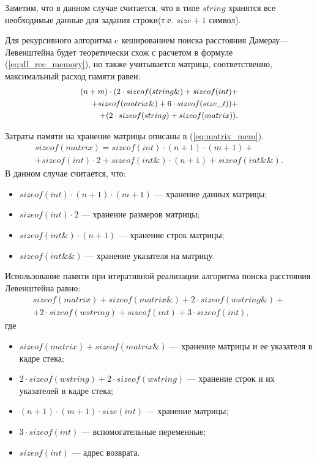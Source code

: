 Заметим, что в данном случае считается, что в типе $string$ хранятся все необходимые данные для задания строки(т.е. $size + 1$ символ).

Для рекурсивного алгоритма c кешированием поиска расстояния Дамерау---Левенштейна будет теоретически схож с расчетом в формуле (\ref{eq:dl_rec_memory}),
но также учитывается матрица, соответственно, максимальный расход памяти равен:
\begin{equation}
	\label{eq:dl_hash_memory}
    \small
	\begin{aligned}
		(n + m) \cdot (2 \cdot sizeof(string\&) + sizeof(int)+\\ +sizeof(matrix\&) + 6 \cdot sizeof(size\_t))+ \\
        + (2 \cdot sizeof(string) + sizeof(matrix)).
	\end{aligned}
\end{equation}

Затраты памяти на хранение матрицы описаны в  (\ref{eq:matrix_mem}).
\begin{equation}
	\label{eq:matrix_mem}
    \begin{aligned}
	sizeof(matrix) = sizeof(int) \cdot (n+1) \cdot (m + 1)+  \\
    + sizeof(int) \cdot 2 + sizeof(int\&) \cdot (n + 1) + sizeof(int\&\&).
    \end{aligned}
\end{equation}
В данном случае считается, что:
\begin{itemize}
	\item $sizeof(int) \cdot (n+1) \cdot (m + 1)$ --- хранение данных матрицы;
	\item $sizeof(int) \cdot 2$ --- хранение размеров матрицы;
	\item $sizeof(int\&) \cdot (n + 1)$ --- хранение строк матрицы;
	\item $sizeof(int\&\&)$ --- хранение указателя на матрицу.
\end{itemize}


Использование памяти при итеративной реализации алгоритма поиска расстояния Левенштейна  равно:
\begin{equation}
	\label{eq:lev_mtr_memory}
	\begin{aligned}
		sizeof(matrix) + sizeof(matrix\&) + 2 \cdot sizeof(wstring\&)+\\
        + 2 \cdot sizeof(wstring) + sizeof(int) + 3 \cdot sizeof(int),
	\end{aligned}
\end{equation}
где
\begin{itemize}
	\item $sizeof(matrix) + sizeof(matrix\&)$ --- хранение матрицы и ее указателя в кадре стека;
	\item $2 \cdot sizeof(wstring) + 2 \cdot sizeof(wstring)$ --- хранение строк и их указателей в кадре стека;
	\item $(n + 1) \cdot (m + 1) \cdot size(int)$ --- хранение матрицы;
	\item $3 \cdot sizeof(int)$ --- вспомогательные переменные;
	\item $sizeof(int)$ --- адрес возврата.
\end{itemize}

